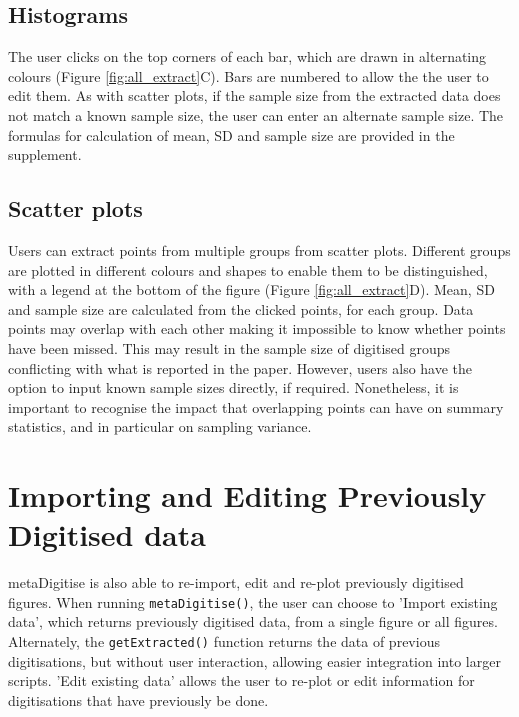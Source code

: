 \documentclass[12pt]{article}
\newcommand{\fct}[1]{\texttt{#1()}}
\newcommand{\pkg}[1]{{\fontseries{b}\selectfont #1}}
\begin{document}
\subsection{Histograms}
The user clicks on the top corners of each bar, which are drawn in alternating colours (Figure \ref{fig:all_extract}C). Bars are numbered to allow the the user to edit them. As with scatter plots, if the sample size from the extracted data does not match a known sample size, the user can enter an alternate sample size. The formulas for calculation of mean, SD and sample size are provided in the supplement.

\subsection{Scatter plots}
Users can extract points from multiple groups from scatter plots. Different groups are plotted in different colours and shapes to enable them to be distinguished, with a legend at the bottom of the figure (Figure \ref{fig:all_extract}D). Mean, SD and sample size are calculated from the clicked points, for each group. Data points may overlap with each other making it impossible to know whether points have been missed. This may result in the sample size of digitised groups conflicting with what is reported in the paper. However, users also have the option to input known sample sizes directly, if required. Nonetheless, it is important to recognise the impact that overlapping points can have on summary statistics, and in particular on sampling variance.






\section{Importing and Editing Previously Digitised data}
\pkg{metaDigitise} is also able to re-import, edit and re-plot previously digitised figures. When running \fct{metaDigitise}, the user can choose to 'Import existing data', which returns previously digitised data, from a single figure or all figures. Alternately, the \fct{getExtracted} function returns the data of previous digitisations, but without user interaction, allowing easier integration into larger scripts. 'Edit existing data' allows the user to re-plot or edit information for digitisations that have previously be done.
\end{document}
